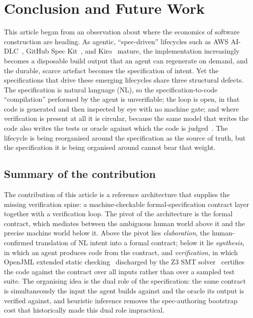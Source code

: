 \section{Conclusion and Future Work}
\label{sec:conclusion}

This article began from an observation about where the economics of software construction are heading. As agentic, ``spec-driven'' lifecycles such as AWS AI-DLC~\cite{awsaidlc}, GitHub Spec Kit~\cite{githubspeckit}, and Kiro~\cite{awskiro} mature, the implementation increasingly becomes a disposable build output that an agent can regenerate on demand, and the durable, scarce artefact becomes the specification of intent. Yet the specifications that drive these emerging lifecycles share three structural defects. The specification is natural language (NL), so the specification-to-code ``compilation'' performed by the agent is unverifiable; the loop is open, in that code is generated and then inspected by eye with no machine gate; and where verification is present at all it is circular, because the same model that writes the code also writes the tests or oracle against which the code is judged~\cite{liu2023evalplus,liu2026oracle}. The lifecycle is being reorganised around the specification as the source of truth, but the specification it is being organised around cannot bear that weight.

\subsection{Summary of the contribution}
\label{subsec:conclusion-summary}

The contribution of this article is a reference architecture that supplies the missing verification spine: a machine-checkable formal-specification contract layer together with a verification loop. The pivot of the architecture is the formal contract, which mediates between the ambiguous human world above it and the precise machine world below it. Above the pivot lies \emph{elaboration}, the human-confirmed translation of NL intent into a formal contract; below it lie \emph{synthesis}, in which an agent produces code from the contract, and \emph{verification}, in which OpenJML extended static checking~\cite{cok2014openjml} discharged by the Z3 SMT solver~\cite{demoura2008z3} certifies the code against the contract over all inputs rather than over a sampled test suite. The organising idea is the dual role of the specification: the same contract is simultaneously the input the agent builds against and the oracle its output is verified against, and heuristic inference removes the spec-authoring bootstrap cost that historically made this dual role impractical.


